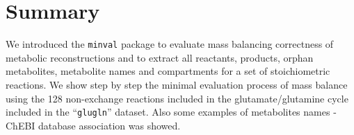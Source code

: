 \section{Summary}
We introduced the \texttt{minval} package to evaluate mass balancing correctness of metabolic reconstructions and to extract all reactants, products, orphan metabolites, metabolite names and compartments for a set of stoichiometric reactions. We show step by step the minimal evaluation process of mass balance using the 128 non-exchange reactions included in the glutamate/glutamine cycle included in the ``\texttt{glugln}'' dataset. Also some examples of metabolites names - ChEBI database association was showed.
